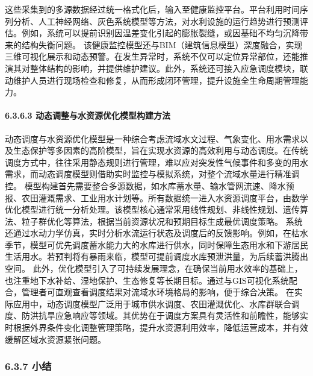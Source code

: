 这些采集到的多源数据经过统一格式化后，输入至健康监控平台。平台利用时间序列分析、人工神经网络、灰色系统模型等方法，对水利设施的运行趋势进行预测评估。例如，系统可以提前识别因温差变化引起的膨胀裂缝，或因基础不均匀沉降带来的结构失衡问题。 该健康监控模型还与BIM（建筑信息模型）深度融合，实现三维可视化展示和动态预警。在发生异常时，系统不仅可以定位异常部位，还能推演其对整体结构的影响，并提供维护建议。此外，系统还可接入应急调度模块，联动维护人员进行现场检查和修复，从而形成闭环管理，提升设施全生命周期管理能力。 \paragraph{6.3.6.3 动态调整与水资源优化模型构建方法}\label{ux52a8ux6001ux8c03ux6574ux4e0eux6c34ux8d44ux6e90ux4f18ux5316ux6a21ux578bux6784ux5efaux65b9ux6cd5} 动态调度与水资源优化模型是一种综合考虑流域水文过程、气象变化、用水需求以及生态保护等多因素的高阶模型，旨在实现水资源的高效利用与动态调度。在传统调度方式中，往往采用静态规则进行管理，难以应对突发性气候事件和多变的用水需求，而动态调度模型则借助实时监控与模拟系统，对整个流域水量进行精准调控。 模型构建首先需要整合多源数据，如水库蓄水量、输水管网流速、降水预报、农田灌溉需求、工业用水计划等。所有数据统一进入水资源调度平台，由数学优化模型进行统一分析处理。该模型核心通常采用线性规划、非线性规划、遗传算法、粒子群优化等算法，根据当前资源状况和预期目标生成最优调度策略。 系统还通过水动力学仿真，实时分析水流运行状态及调度后的反馈影响。例如，在枯水季节，模型可优先调度蓄水能力大的水库进行供水，同时保障生态用水和下游居民生活用水。若预判将有暴雨来临，模型可提前调度水库预泄洪量，为后续蓄洪腾出空间。 此外，优化模型引入了可持续发展理念，在确保当前用水效率的基础上，也注重地下水补给、湿地保护、生态修复等长期目标。通过与GIS可视化系统配合，管理者可直观查看调度结果对流域水环境格局的影响，便于综合决策。 在实际应用中，动态调度模型广泛用于城市供水调度、农田灌溉优化、水库群联合调度、防洪抗旱应急响应等领域。其优势在于调度方案具有灵活性和前瞻性，能够实时根据外界条件变化调整管理策略，提升水资源利用效率，降低运营成本，并有效缓解区域水资源紧张问题。 \subsubsection{6.3.7 小结}\label{ux5c0fux7ed3} 